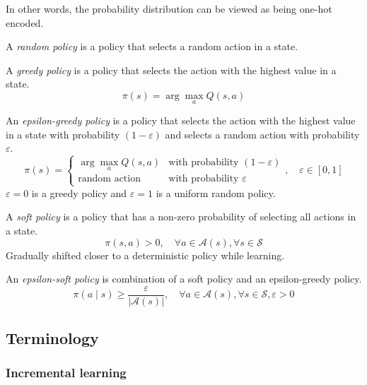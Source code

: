 In other words, the probability distribution can be viewed as being one-hot encoded.

A \textit{random policy} is a policy that selects a random action in a state.

A \textit{greedy policy} is a policy that selects the action with the highest value in a state.
\begin{equation}
    \pi(s) = \arg\max_a Q(s, a)
\end{equation}

An \textit{epsilon-greedy policy} is a policy that selects the action with the highest value in a state with probability \( (1 - \varepsilon) \) and selects a random action with probability \( \varepsilon \).
\begin{equation}
    \pi(s) = \begin{cases}
        \arg\max_a Q(s, a)
         &
        \text{with probability } (1 - \varepsilon)
        \\
        \text{random action}
         &
        \text{with probability } \varepsilon
    \end{cases}
    , \quad \varepsilon \in [0, 1]
\end{equation}
\( \varepsilon = 0 \) is a greedy policy and \( \varepsilon = 1 \) is a uniform random policy.

A \textit{soft policy} is a policy that has a non-zero probability of selecting all actions in a state.
\begin{equation}
    \pi(s, a) > 0, \quad \forall a \in \mathcal{A}(s), \forall s \in \mathcal{S}
\end{equation}
Gradually shifted closer to a deterministic policy while learning.

An \textit{epsilon-soft policy} is combination of a soft policy and an epsilon-greedy policy.
\begin{equation}
    \pi(a \mid s) \geq \frac{\varepsilon}{|\mathcal{A}(s)|}, \quad \forall a \in \mathcal{A}(s), \forall s \in \mathcal{S}, \varepsilon > 0
\end{equation}

\subsection{Terminology}

\subsubsection{Incremental learning}

